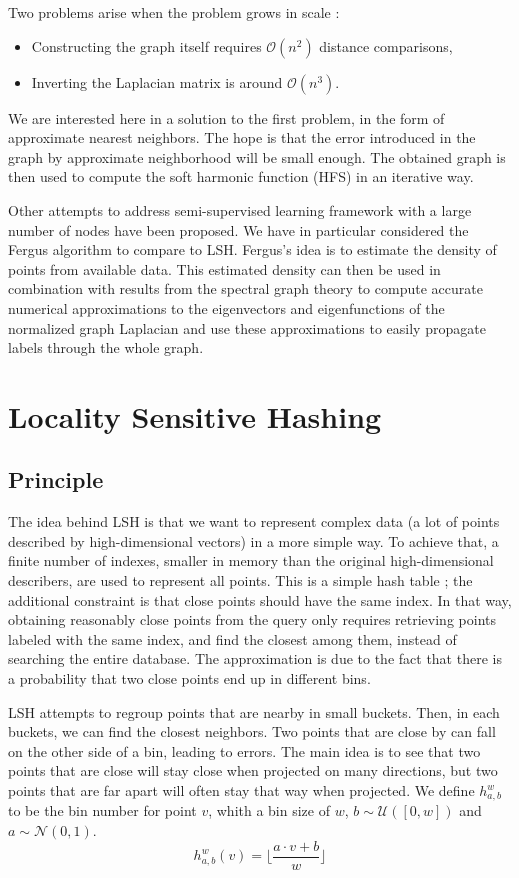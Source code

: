 \documentclass{article} %
\begin{document}
Two problems arise when the problem grows in scale :
\begin{itemize}
\item Constructing the graph itself requires $\mathcal{O}(n^2)$ distance comparisons,
\item Inverting the Laplacian matrix is around $\mathcal{O}(n^3)$.
\end{itemize}

We are interested here in a solution to the first problem, in the form of approximate nearest neighbors. The hope is that the error introduced in the graph by approximate neighborhood will be small enough. The obtained graph is then used to compute the soft harmonic function (HFS) in an iterative way.

Other attempts to address semi-supervised learning framework with a large number of nodes have been proposed. We have in particular considered the Fergus algorithm \cite{fergus2009semi} to compare to LSH. Fergus's idea is to estimate the density of points from available data. This estimated density can then be used in combination with results from the spectral graph theory to compute accurate numerical approximations to the eigenvectors and eigenfunctions of the normalized graph Laplacian and use these approximations to easily propagate labels through the whole graph.


\section{Locality Sensitive Hashing}
\subsection{Principle}

The idea behind LSH is that we want to represent complex data (a lot of points described by high-dimensional vectors) in a more simple way. To achieve that, a finite number of indexes, smaller in memory than the original high-dimensional describers, are used to represent all points. This is a simple hash table ; the additional constraint is that close points should have the same index. In that way, obtaining reasonably close points from the query only requires retrieving points labeled with the same index, and find the closest among them, instead of searching the entire database. The approximation is due to the fact that there is a probability that two close points end up in different bins.

LSH attempts to regroup points that are nearby in small buckets. Then, in each buckets, we can find the closest neighbors. Two points that are close by can fall on the other side of a bin, leading to errors. The main idea is to see that two points that are close will stay close when projected on many directions, but two points that are far apart will often stay that way when projected. We define $h^w_{a,b}$ to be the bin number for point $v$, whith a bin size of $w$, $b \sim \mathcal{U}([0,w])$ and $a \sim \mathcal{N}(0,1)$.
$$h_{a,b}^w(v) = \lfloor \frac{ a \cdot v + b}{w} \rfloor$$
\end{document}
